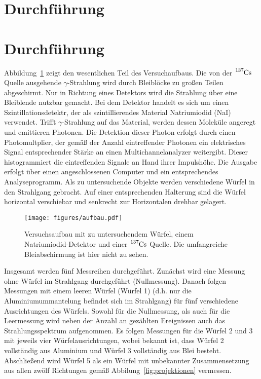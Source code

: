 \section{Durchführung}
\label{sec:Durchführung}
\section{Durchführung}
\label{sec:durchführung}

Abbildung~\ref{fig:aufbau} zeigt den wesentlichen Teil des Versuchaufbaus. Die
von der $\ce{^{137}Cs}$ Quelle ausgehende $\gamma$-Strahlung wird durch
Bleiblöcke zu großen Teilen abgeschirmt. Nur in Richtung eines Detektors wird
die Strahlung über eine Bleiblende nutzbar gemacht. Bei dem Detektor handelt es
sich um einen Szintillationsdetektr, der als szintillierendes Material
Natriumiodid (NaI) verwendet. Trifft $\gamma$-Strahlung auf das Material, werden
dessen Moleküle angeregt und emittieren Photonen. Die Detektion dieser Photon
erfolgt durch einen Photomultplier, der gemäß der Anzahl eintreffender Photonen
ein elektrisches Signal entsprechender Stärke an einen Multichannelanalyzer
weitergibt. Dieser histogrammiert die eintreffenden Signale an Hand ihrer
Impulshöhe. Die Ausgabe erfolgt über einen angeschlossenen Computer und ein
entsprechendes Analyseprogramm. Als zu untersuchende Objekte werden verschiedene
Würfel in den Strahlgang gebracht. Auf einer entsprechenden Halterung sind die
Würfel horizontal verschiebar und senkrecht zur Horizontalen drehbar gelagert.

\begin{figure}
  \centering
  \texttt{[image: figures/aufbau.pdf]}
  \caption{Versuchsaufbau mit zu untersuchendem Würfel, einem 
  Natriumiodid-Detektor und einer $\ce{^{137}Cs}$ Quelle. Die umfangreiche
  Bleiabschirmung ist hier nicht zu sehen.}
  \label{fig:aufbau}
\end{figure}

Insgesamt werden fünf Messreihen durchgeführt. Zunächst wird eine Messung ohne
Würfel im Strahlgang durchgeführt (Nullmessung). Danach folgen Messungen mit
einem leeren Würfel (Würfel 1) (d.h. nur die Aluminiumummantelung befindet sich
im Strahlgang) für fünf verschiedene Ausrichtungen des Würfels. Sowohl für die
Nullmessung, als auch für die Leermessung wird neben der Anzahl an gezählten
Ereignissen auch das Strahlungsspektrum aufgenommen. Es folgen Messungen für die
Würfel 2 und 3 mit jeweils vier Würfelausrichtungen, wobei bekannt ist, dass
Würfel 2 vollständig aus Aluminium und Würfel 3 vollständig aus Blei besteht.
Abschließend wird Würfel 5 als ein Würfel mit unbekannter Zusammensetzung aus
allen zwölf Richtungen gemäß Abbilung~\ref{fig:projektionen} vermessen.
